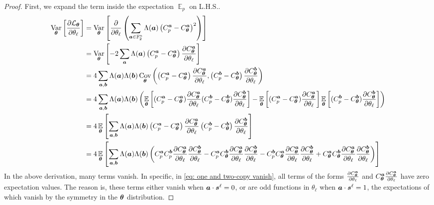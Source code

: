 \documentclass[10pt, twocolumn, a4paper]{article}
\theoremstyle{plain}
\theoremstyle{definition}
\theoremstyle{remark}
\begin{document}
\begin{proof}
First, we expand the term inside the expectation $\operatorname*{\mathbb{E}}_p$ on L.H.S..
\begin{align}
    \operatorname*{Var}_{{\bm{\theta}}} \left[ \frac{\partial \mathcal{L}_{\bm{\theta}}}{\partial \theta_\ell} \right] &=    \operatorname*{Var}_{{\bm{\theta}}} \left[ \frac{\partial }{\partial \theta_\ell}  \left(\sum_{{\bm{a}} \in \mathbb{F}_2^n} \Lambda({\bm{a}})\left(C^{\bm{a}}_p - C^{\bm{a}}_{\bm{\theta}} \right)^2\right)\right]
\\ &= \operatorname*{Var}_{{\bm{\theta}}} \left[-2 \sum_{\bm{a}} \Lambda({\bm{a}}) \left(C^{\bm{a}}_p - C^{\bm{a}}_{\bm{\theta}} \right) \frac{\partial C^{\bm{a}}_{\bm{\theta}}}{\partial \theta_\ell} \right] \\
&= 4 \sum_{{\bm{a}}, {\bm{b}}} \Lambda({\bm{a}}) \Lambda({\bm{b}}) \operatorname*{Cov}_{{\bm{\theta}}}\left(\left(C^{\bm{a}}_p - C^{\bm{a}}_{\bm{\theta}}\right) \frac{\partial C^{\bm{a}}_{\bm{\theta}}}{\partial \theta_\ell} , \left(C^{\bm{b}}_p - C^{\bm{b}}_{\bm{\theta}}\right) \frac{\partial C^{\bm{b}}_{\bm{\theta}}}{\partial \theta_\ell} \right) \\
&= 4 \sum_{{\bm{a}}, {\bm{b}}} \Lambda({\bm{a}}) \Lambda({\bm{b}}) \left(\operatorname*{\mathbb{E}}_{{\bm{\theta}}} \left[ (C^{\bm{a}}_p - C^{\bm{a}}_{\bm{\theta}}) \frac{\partial C^{\bm{a}}_{\bm{\theta}}}{\partial \theta_\ell} (C^{\bm{b}}_p - C^{\bm{b}}_{\bm{\theta}}) \frac{\partial C^{\bm{b}}_{\bm{\theta}}}{\partial \theta_\ell} \right] - \operatorname*{\mathbb{E}}_{{\bm{\theta}}}\left[(C^{\bm{a}}_p - C^{\bm{a}}_{\bm{\theta}}) \frac{\partial C^{\bm{a}}_{\bm{\theta}}}{\partial \theta_\ell} \right] \operatorname*{\mathbb{E}}_{{\bm{\theta}}}\left[(C^{\bm{b}}_p - C^{\bm{b}}_{\bm{\theta}}) \frac{\partial C^{\bm{b}}_{\bm{\theta}}}{\partial \theta_\ell} \right] \right) \label{eq: one and two-copy vanish} \\
&= 4 \operatorname*{\mathbb{E}}_{{\bm{\theta}}} \left[\sum_{{\bm{a}}, {\bm{b}}} \Lambda({\bm{a}}) \Lambda({\bm{b}})  \left( C^{\bm{a}}_p - C^{\bm{a}}_{\bm{\theta}} \right) \frac{\partial C^{\bm{a}}_{\bm{\theta}}}{\partial \theta_\ell} \left(C^{\bm{b}}_p - C^{\bm{b}}_{\bm{\theta}}\right) \frac{\partial C^{\bm{b}}_{\bm{\theta}}}{\partial \theta_\ell} \right] \\
&= 4 \operatorname*{\mathbb{E}}_{{\bm{\theta}}} \left[ \sum_{{\bm{a}}, {\bm{b}}} \Lambda({\bm{a}}) \Lambda({\bm{b}}) \left( C^{\bm{a}}_p C^{\bm{b}}_p \frac{\partial C_{\bm{\theta}}^{\bm{a}}}{\partial \theta_\ell} \frac{\partial C_{\bm{\theta}}^{\bm{b}}}{\partial \theta_\ell} - C^{\bm{a}}_p C_{\bm{\theta}}^{\bm{b}} \frac{\partial C_{\bm{\theta}}^{\bm{a}}}{\partial \theta_\ell} \frac{\partial C_{\bm{\theta}}^{\bm{b}}}{\partial \theta_\ell} - C^{\bm{b}}_p C_{\bm{\theta}}^{\bm{a}} \frac{\partial C_{\bm{\theta}}^{\bm{a}}}{\partial \theta_\ell} \frac{\partial C_{\bm{\theta}}^{\bm{b}}}{\partial \theta_\ell} + C_{\bm{\theta}}^{\bm{a}} C_{\bm{\theta}}^{\bm{b}} \frac{\partial C_{\bm{\theta}}^{\bm{a}}}{\partial \theta_\ell} \frac{\partial C_{\bm{\theta}}^{\bm{b}}}{\partial \theta_\ell} \right)\right] \label{eq: two three four copies}
\end{align}
In the above derivation, many terms vanish. In specific, in \cref{eq: one and two-copy vanish}, all terms of the forms $\frac{\partial C_{\bm{\theta}}^{\bm{a}}}{\partial \theta_\ell} $ and $C^{\bm{a}}_{\bm{\theta}}\frac{\partial C_{\bm{\theta}}^{\bm{a}}}{\partial \theta_\ell}$ have zero expectation values. The reason is, these terms either vanish when ${\bm{a}} \cdot{\bm{s}^\ell} =0$, or are odd functions in $\theta_\ell$ when ${\bm{a}} \cdot{\bm{s}^\ell} =1$, the expectations of which vanish by the symmetry in the ${\bm{\theta}}$ distribution.


\end{proof}
\end{document}
